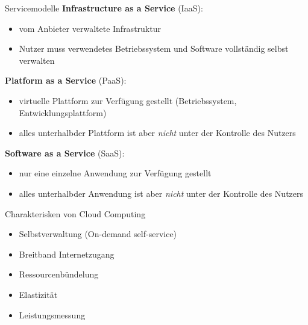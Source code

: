 \documentclass[german]{../spicker}
\begin{document}
\begin{defi}{Servicemodelle}
    \textbf{Infrastructure as a Service} (IaaS):
    \begin{itemize}
        \item vom Anbieter verwaltete Infrastruktur
        \item Nutzer muss verwendetes Betriebssystem und Software vollständig selbst verwalten
    \end{itemize}

    \textbf{Platform as a Service} (PaaS):
    \begin{itemize}
        \item virtuelle Plattform zur Verfügung gestellt (Betriebssystem, Entwicklungsplattform)
        \item alles \glqq unterhalb\grqq der Plattform ist aber \emph{nicht} unter der Kontrolle des Nutzers
    \end{itemize}

    \textbf{Software as a Service} (SaaS):
    \begin{itemize}
        \item nur eine einzelne Anwendung zur Verfügung gestellt
        \item alles \glqq unterhalb\grqq der Anwendung ist aber \emph{nicht} unter der Kontrolle des Nutzers
    \end{itemize}
\end{defi}

\begin{bonus}{Charakterisken von Cloud Computing}
    \begin{itemize}
        \item Selbstverwaltung (On-demand self-service)
        \item Breitband Internetzugang
        \item Ressourcenbündelung
        \item Elastizität
        \item Leistungsmessung
    \end{itemize}
\end{bonus}
\end{document}

